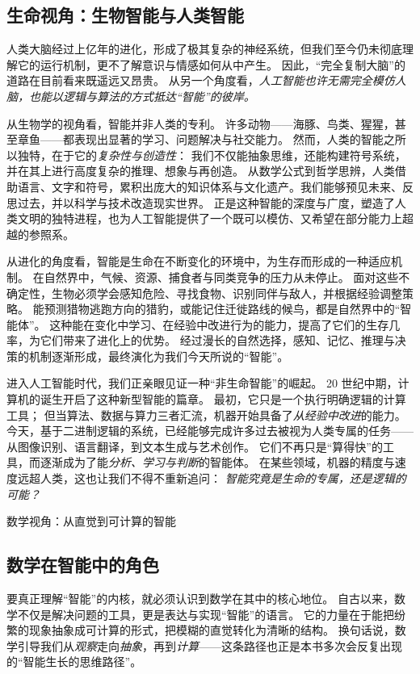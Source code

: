 \subsection{生命视角：生物智能与人类智能}

人类大脑经过上亿年的进化，形成了极其复杂的神经系统，但我们至今仍未彻底理解它的运行机制，更不了解意识与情感如何从中产生。  
因此，“完全复制大脑”的道路在目前看来既遥远又昂贵。  
从另一个角度看，\emph{人工智能也许无需完全模仿人脑，也能以逻辑与算法的方式抵达“智能”的彼岸。}  

从生物学的视角看，智能并非人类的专利。  
许多动物——海豚、鸟类、猩猩，甚至章鱼——都表现出显著的学习、问题解决与社交能力。
然而，人类的智能之所以独特，在于它的\emph{复杂性与创造性}：  
我们不仅能抽象思维，还能构建符号系统，并在其上进行高度复杂的推理、想象与再创造。  
从数学公式到哲学思辨，人类借助语言、文字和符号，累积出庞大的知识体系与文化遗产。我们能够预见未来、反思过去，并以科学与技术改造现实世界。
正是这种智能的深度与广度，塑造了人类文明的独特进程，也为人工智能提供了一个既可以模仿、又希望在部分能力上超越的参照系。  

从进化的角度看，智能是生命在不断变化的环境中，为生存而形成的一种适应机制。  
在自然界中，气候、资源、捕食者与同类竞争的压力从未停止。  
面对这些不确定性，生物必须学会感知危险、寻找食物、识别同伴与敌人，并根据经验调整策略。
能预测猎物逃跑方向的猎豹，或能记住迁徙路线的候鸟，都是自然界中的“智能体”。  
这种能在变化中学习、在经验中改进行为的能力，提高了它们的生存几率，为它们带来了进化上的优势。
经过漫长的自然选择，感知、记忆、推理与决策的机制逐渐形成，最终演化为我们今天所说的“智能”。

进入人工智能时代，我们正亲眼见证一种“非生命智能”的崛起。  
20 世纪中期，计算机的诞生开启了这种新型智能的篇章。  
最初，它只是一个执行明确逻辑的计算工具；  
但当算法、数据与算力三者汇流，机器开始具备了\emph{从经验中改进}的能力。  
今天，基于二进制逻辑的系统，已经能够完成许多过去被视为人类专属的任务——从图像识别、语言翻译，到文本生成与艺术创作。
它们不再只是“算得快”的工具，而逐渐成为了能\emph{分析、学习与判断}的智能体。  
在某些领域，机器的精度与速度远超人类，这也让我们不得不重新追问：  
\emph{智能究竟是生命的专属，还是逻辑的可能？}  

数学视角：从直觉到可计算的智能
\subsection{数学在智能中的角色}
要真正理解“智能”的内核，就必须认识到数学在其中的核心地位。
自古以来，数学不仅是解决问题的工具，更是表达与实现“智能”的语言。
它的力量在于能把纷繁的现象抽象成可计算的形式，把模糊的直觉转化为清晰的结构。
换句话说，数学引导我们从\emph{观察}走向\emph{抽象}，再到\emph{计算}——这条路径也正是本书多次会反复出现的“智能生长的思维路径”。  

